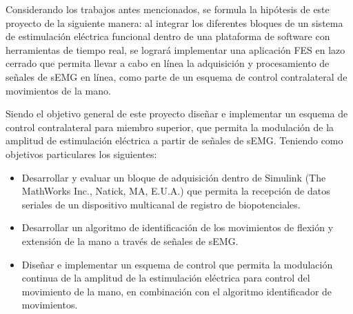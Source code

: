 Considerando los trabajos antes mencionados, se formula la hipótesis de este proyecto de la siguiente manera: al integrar los diferentes bloques de un sistema de estimulación eléctrica funcional dentro de una plataforma de software con herramientas de tiempo real, se logrará implementar una aplicación FES en lazo cerrado que permita llevar a cabo en línea la adquisición y procesamiento de señales de sEMG en línea, como parte de un esquema de control contralateral de movimientos de la mano.

Siendo el objetivo general de este proyecto diseñar e implementar un esquema de control contralateral para miembro superior, que permita la modulación de la amplitud de estimulación eléctrica a partir de señales de sEMG. Teniendo como objetivos particulares los siguientes:

\begin{itemize}
	\item Desarrollar y evaluar un bloque de adquisición dentro de Simulink\textregistered \;  (The MathWorks Inc., Natick, MA, E.U.A.) que permita la recepción de datos seriales de un dispositivo multicanal de registro de biopotenciales.
	\item Desarrollar un algoritmo de identificación de los movimientos de flexión y extensión de la mano a través de señales de sEMG.
	\item Diseñar e implementar un esquema de control que permita la modulación continua de la amplitud de la estimulación eléctrica para control del movimiento de la mano, en combinación con el algoritmo identificador de movimientos.
\end{itemize}
